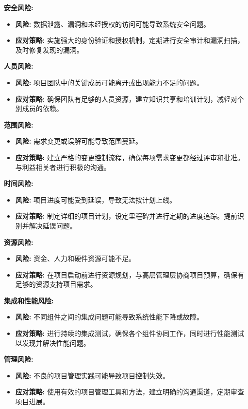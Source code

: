 \documentclass{article}
\begin{document}
\textbf{安全风险:}
\begin{itemize}
  \item \textbf{风险:} 数据泄露、漏洞和未经授权的访问可能导致系统安全问题。
  \item \textbf{应对策略:} 实施强大的身份验证和授权机制，定期进行安全审计和漏洞扫描，及时修复发现的漏洞。
\end{itemize}

\textbf{人员风险:}
\begin{itemize}
  \item \textbf{风险:} 项目团队中的关键成员可能离开或出现能力不足的问题。
  \item \textbf{应对策略:} 确保团队有足够的人员资源，建立知识共享和培训计划，减轻对个别成员的依赖。
\end{itemize}

\textbf{范围风险:}
\begin{itemize}
  \item \textbf{风险:} 需求变更或误解可能导致范围蔓延。
  \item \textbf{应对策略:} 建立严格的变更控制流程，确保每项需求变更都经过评审和批准。与利益相关者进行积极的沟通。
\end{itemize}

\textbf{时间风险:}
\begin{itemize}
  \item \textbf{风险:} 项目进度可能受到延误，导致无法按计划上线。
  \item \textbf{应对策略:} 制定详细的项目计划，设定里程碑并进行定期的进度追踪。提前识别并解决延误问题。
\end{itemize}

\textbf{资源风险:}
\begin{itemize}
  \item \textbf{风险:} 资金、人力和硬件资源可能不足。
  \item \textbf{应对策略:} 在项目启动前进行资源规划，与高层管理层协商项目预算，确保有足够的资源支持项目需求。
\end{itemize}

\textbf{集成和性能风险:}
\begin{itemize}
  \item \textbf{风险:} 不同组件之间的集成问题可能导致系统性能下降或故障。
  \item \textbf{应对策略:} 进行持续的集成测试，确保各个组件协同工作，同时进行性能测试以发现并解决性能问题。
\end{itemize}

\textbf{管理风险:}
\begin{itemize}
  \item \textbf{风险:} 不良的项目管理实践可能导致项目控制失效。
  \item \textbf{应对策略:} 使用有效的项目管理工具和方法，建立明确的沟通渠道，定期审查项目进展。
\end{itemize}
\end{document}
